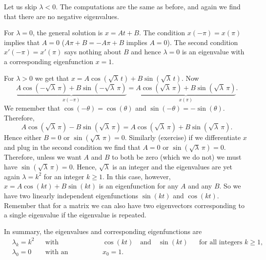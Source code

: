 \documentclass{ximera}
\begin{document}
\begin{exampleSol}
    Let us skip $\lambda < 0$.  The computations are the same as before, and again we find that there are no negative eigenvalues.
    
    For $\lambda = 0$, the general solution is $x = At + B$.  The condition $x(-\pi) = x(\pi)$ implies that $A=0$ ($A\pi + B = -A\pi +B$ implies $A=0$). The second condition $x'(-\pi) = x'(\pi)$ says nothing about $B$ and hence $\lambda=0$ is an eigenvalue with a corresponding eigenfunction $x=1$.
    
    For $\lambda > 0$ we get that $x = A \cos ( \sqrt{\lambda}\, t ) + B \sin ( \sqrt{\lambda}\, t)$. Now
    \begin{equation*}
        \underbrace{A \cos (-\sqrt{\lambda}\, \pi) + B \sin (-\sqrt{\lambda}\, \pi)}_{x(-\pi)}
        = \underbrace{A \cos (  \sqrt{\lambda}\, \pi ) + B \sin ( \sqrt{\lambda}\, \pi)}_{x(\pi)} .
    \end{equation*}
    We remember that $\cos (- \theta) = \cos (\theta)$ and $\sin (-\theta) = - \sin (\theta)$.  Therefore,
    \begin{equation*}
        A \cos (\sqrt{\lambda}\, \pi) - B \sin ( \sqrt{\lambda}\, \pi)
        = A \cos (\sqrt{\lambda}\, \pi) + B \sin ( \sqrt{\lambda}\, \pi).
    \end{equation*}
    Hence either $B=0$ or $\sin ( \sqrt{\lambda}\, \pi) = 0$. Similarly (exercise) if we differentiate $x$ and plug in the second condition we find that $A=0$ or $\sin ( \sqrt{\lambda}\, \pi) = 0$. Therefore, unless we want $A$ and $B$ to both be zero (which we do not) we must have $\sin ( \sqrt{\lambda}\, \pi ) = 0$.  Hence, $\sqrt{\lambda}$ is an integer and the eigenvalues are yet again $\lambda = k^2$ for an integer $k \geq 1$.  In this case, however,  $x = A \cos (k t) + B \sin (k t)$ is an eigenfunction for any $A$ and any $B$. So we have two linearly independent eigenfunctions $\sin (kt)$ and $\cos (kt)$. Remember that for a matrix we can also have two eigenvectors corresponding to a single eigenvalue if the eigenvalue is repeated.
    
    In summary, the eigenvalues and corresponding eigenfunctions are
    \begin{align*}
        & \lambda_k = k^2 & & \text{with eigenfunctions} & & \cos (k t) \quad \text{and}\quad  \sin (k t)  & & \text{for all integers } k \geq 1 , \\
        & \lambda_0 = 0 & & \text{with an eigenfunction} & & x_0 = 1.
    \end{align*}
\end{exampleSol}
\end{document}
